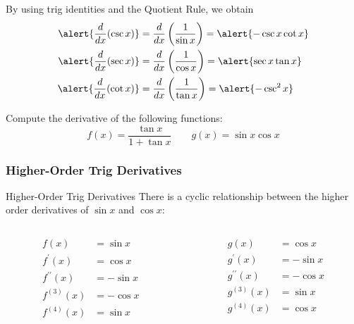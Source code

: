 \documentclass[cal1spr16Lectures.tex]{subfiles}
\begin{document}
\begin{frame}{}
By using trig identities and the Quotient Rule, we obtain
\begin{align*}
\alert{\frac{d}{dx} (\csc x)} &= \frac{d}{dx} \left( \frac{1}{\sin x}\right) = \alert{-\csc x \cot x} \\
\alert{\frac{d}{dx} (\sec x)} &= \frac{d}{dx} \left( \frac{1}{\cos x}\right) = \alert{\sec x \tan x} \\
\alert{\frac{d}{dx} (\cot x)} &= \frac{d}{dx} \left( \frac{1}{\tan x}\right) = \alert{-\csc^2 x}  
\end{align*}
\end{frame}

\begin{frame}
\begin{exe} Compute the derivative of the following functions:
\[f(x)=\frac{\tan x}{1+\tan x} \qquad g(x)=\sin x \cos x\]
\end{exe}
\end{frame}

\subsubsection{Higher-Order Trig Derivatives}

\begin{frame}{\small Higher-Order Trig Derivatives}
There is a cyclic relationship between the higher order derivatives of $\sin x$ and $\cos x$:
\begin{columns}
\begin{column}{.45\textwidth}
\[\begin{split}
	f(x) &=\sin x \\  
	f^{\prime}(x) &=\cos x \\
	f^{\prime\prime}(x) &=-\sin x \\
	f^{(3)}(x) &=-\cos x \\
	f^{(4)}(x) &=\sin x 
\end{split}\]
\end{column}
\begin{column}{.6\textwidth}
\[\begin{split}
	g(x) &=\cos x \\
	g^{\prime}(x) &=-\sin x \\
	g^{\prime\prime}(x) &=-\cos x \\
	g^{(3)}(x) &=\sin x \\
	g^{(4)}(x) &=\cos x 
\end{split}\]
\end{column}
\end{columns}
\end{frame}
\end{document}
